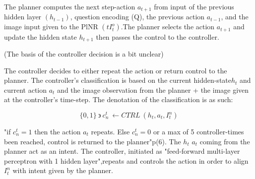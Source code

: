 The planner computes the next step-action  \begin{math} a_{t+1} \end{math} from input of the previous hidden layer \begin{math} (h_{t-1}) \end{math}, question encoding (Q), the previous action  \begin{math} a_{t-1} \end{math}, and the image input given to the PlNR \begin{math} (tI_{t}^{o}) \end{math}.The planner selects the action \begin{math} a_{t+1}\end{math} and update the hidden state \begin{math} h_{t+1} \end{math} then passes the control to the controller. 

\vspace{0.3cm}
(The basis of the controller decision is a bit unclear)

The controller decides to either repeat the action or return control to the planner. The controller's classification is based on the current hidden-state\begin{math} h_{t}  \end{math} and current action \begin{math} a_{t} \end{math} and the image observation from the planner + the image given at the controller's time-step. The denotation of the classification is as such: 

\vspace{0.3cm}

\[ \{0,1\} \ \backepsilon \ c_{n}^{t} \ \leftarrow CTRL\ \left( h_{t} ,a_{t} ,I_{t}^{n}\right)  \]

"if \begin{math} c_{n}^{t} = 1 \end{math} then the action \begin{math} a_{t} \end{math} repeats. Else \begin{math} c_{n}^{t} = 0 \end{math} or a max of 5 controller-times been reached, control is returned to the planner"p(6). The \begin{math} h_{t} \end{math}   \begin{math} a_{t} \end{math} coming from the planner act as an intent. The controller, initiated  as "feed-forward multi-layer perceptron with 1 hidden layer",repeats and controls the action in order to align \begin{math}  I_{t}^{n} \end{math} with intent given by the planner. 

